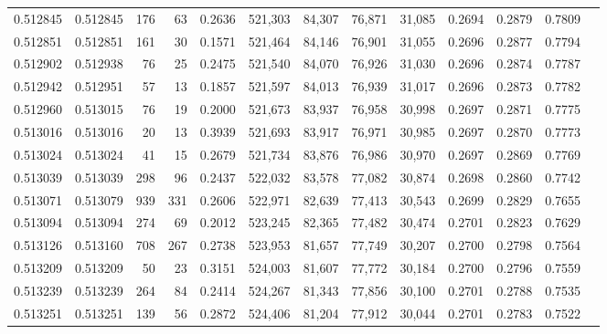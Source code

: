 \begin{tabular}{rrrrrrrrrrrrr}
0.512845 & 0.512845 &   176 &    63 &                                     0.2636 & 521,303 &  84,307 &  76,871 &  31,085 & 0.2694 & 0.2879 & 0.7809 \\
0.512851 & 0.512851 &   161 &    30 &                                     0.1571 & 521,464 &  84,146 &  76,901 &  31,055 & 0.2696 & 0.2877 & 0.7794 \\
0.512902 & 0.512938 &    76 &    25 &                                     0.2475 & 521,540 &  84,070 &  76,926 &  31,030 & 0.2696 & 0.2874 & 0.7787 \\
0.512942 & 0.512951 &    57 &    13 &                                     0.1857 & 521,597 &  84,013 &  76,939 &  31,017 & 0.2696 & 0.2873 & 0.7782 \\
0.512960 & 0.513015 &    76 &    19 &                                     0.2000 & 521,673 &  83,937 &  76,958 &  30,998 & 0.2697 & 0.2871 & 0.7775 \\
0.513016 & 0.513016 &    20 &    13 &                                     0.3939 & 521,693 &  83,917 &  76,971 &  30,985 & 0.2697 & 0.2870 & 0.7773 \\
0.513024 & 0.513024 &    41 &    15 &                                     0.2679 & 521,734 &  83,876 &  76,986 &  30,970 & 0.2697 & 0.2869 & 0.7769 \\
0.513039 & 0.513039 &   298 &    96 &                                     0.2437 & 522,032 &  83,578 &  77,082 &  30,874 & 0.2698 & 0.2860 & 0.7742 \\
0.513071 & 0.513079 &   939 &   331 &                                     0.2606 & 522,971 &  82,639 &  77,413 &  30,543 & 0.2699 & 0.2829 & 0.7655 \\
0.513094 & 0.513094 &   274 &    69 &                                     0.2012 & 523,245 &  82,365 &  77,482 &  30,474 & 0.2701 & 0.2823 & 0.7629 \\
0.513126 & 0.513160 &   708 &   267 &                                     0.2738 & 523,953 &  81,657 &  77,749 &  30,207 & 0.2700 & 0.2798 & 0.7564 \\
0.513209 & 0.513209 &    50 &    23 &                                     0.3151 & 524,003 &  81,607 &  77,772 &  30,184 & 0.2700 & 0.2796 & 0.7559 \\
0.513239 & 0.513239 &   264 &    84 &                                     0.2414 & 524,267 &  81,343 &  77,856 &  30,100 & 0.2701 & 0.2788 & 0.7535 \\
0.513251 & 0.513251 &   139 &    56 &                                     0.2872 & 524,406 &  81,204 &  77,912 &  30,044 & 0.2701 & 0.2783 & 0.7522 \\

\end{tabular}
